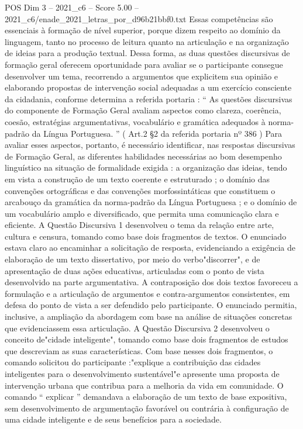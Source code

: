 \begin{textsample}{POS Dim 3 – 2021\_c6 – Score 5.00 – 2021\_c6/enade\_2021\_letras\_por\_d96b21bbf0.txt}
Essas competências são essenciais à formação de nível superior, porque dizem respeito ao domínio da linguagem, tanto no processo de leitura quanto na articulação e na organização de ideias para a produção textual.
Dessa forma, as duas questões discursivas de formação geral oferecem oportunidade para avaliar se o participante consegue desenvolver um tema, recorrendo a argumentos que explicitem sua opinião e elaborando propostas de intervenção social adequadas a um exercício consciente da cidadania, conforme determina a referida portaria : “ As questões discursivas do componente de Formação Geral avaliam aspectos como clareza, coerência, coesão, estratégias argumentativas, vocabulário e gramática adequados à norma-padrão da Língua Portuguesa. ” ( Art.2 §2 da referida portaria nº 386 ) Para avaliar esses aspectos, portanto, é necessário identificar, nas respostas discursivas de Formação Geral, as diferentes habilidades necessárias ao bom desempenho linguístico na situação de formalidade exigida : a organização das ideias, tendo em vista a construção de um texto coerente e estruturado ; o domínio das convenções ortográficas e das convenções morfossintáticas que constituem o arcabouço da gramática da norma-padrão da Língua Portuguesa ; e o domínio de um vocabulário amplo e diversificado, que permita uma comunicação clara e eficiente.
A Questão Discursiva 1 desenvolveu o tema da relação entre arte, cultura e censura, tomando como base dois fragmentos de textos.
O enunciado estava claro ao encaminhar a solicitação de resposta, evidenciando a exigência de elaboração de um texto dissertativo, por meio do verbo"discorrer", e de apresentação de duas ações educativas, articuladas com o ponto de vista desenvolvido na parte argumentativa.
A contraposição dos dois textos favoreceu a formulação e a articulação de argumentos e contra-argumentos consistentes, em defesa do ponto de vista a ser defendido pelo participante.
O enunciado permitia, inclusive, a ampliação da abordagem com base na análise de situações concretas que evidenciassem essa articulação.
A Questão Discursiva 2 desenvolveu o conceito de"cidade inteligente", tomando como base dois fragmentos de estudos que descreviam as suas características.
Com base nesses dois fragmentos, o comando solicitou do participante :"explique a contribuição das cidades inteligentes para o desenvolvimento sustentável"e apresente uma proposta de intervenção urbana que contribua para a melhoria da vida em comunidade.
O comando “ explicar ” demandava a elaboração de um texto de base expositiva, sem desenvolvimento de argumentação favorável ou contrária à configuração de uma cidade inteligente e de seus benefícios para a sociedade.

\end{textsample}
